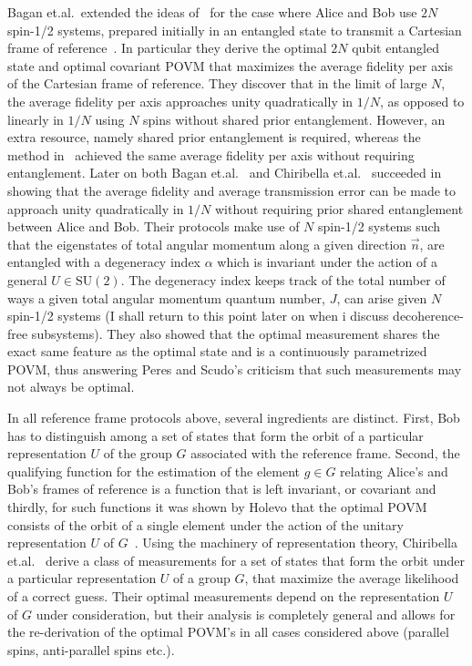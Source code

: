 \documentclass{article}
\begin{document}
Bagan et.al.~extended the ideas of~\cite{AJV01} for the case where Alice and Bob use $2N$ spin-1/2 systems, prepared initially in an entangled state to transmit a Cartesian frame of reference~\cite{BBM04a}.  In particular they derive the optimal $2N$ qubit entangled state and optimal covariant POVM that maximizes the average fidelity per axis of the Cartesian frame of reference. They discover that in the limit of large $N$, the average fidelity per axis approaches unity quadratically in $1/N$, as opposed to linearly in $1/N$ using $N$ spins without shared prior entanglement.  However, an extra resource, namely shared prior entanglement is required, whereas the method in~\cite{PS02a,PS02b} achieved the same average fidelity per axis without requiring entanglement.  Later on both Bagan et.al.~\cite{BBM04a} and Chiribella et.al.~\cite{CDPS04a} succeeded in showing that the average fidelity and average transmission error can be made to approach unity quadratically in $1/N$ without requiring prior shared entanglement between Alice and Bob.  Their protocols make use of $N$ spin-1/2 systems such that the eigenstates of total angular momentum along a given direction $\vec{n}$, are entangled with a degeneracy index $\alpha$ which is invariant under the action of a general $U\in\mathrm{SU}(2)$.  The degeneracy index keeps track of the total number of ways a given total angular momentum quantum number, $J$, can arise given $N$ spin-1/2 systems (I shall return to this point later on when i discuss decoherence-free subsystems).  They also showed that the optimal measurement shares the exact same feature as the optimal state and is a continuously parametrized POVM, thus answering Peres and Scudo's criticism that such measurements may not always be optimal.

In all reference frame protocols above, several ingredients are distinct.  First, Bob has to distinguish among a set of states that form the orbit of a particular representation $U$ of the group $G$ associated with the reference frame.  Second, the qualifying function for the estimation of the element $g\in G$ relating Alice's and Bob's frames of reference is a function that is left invariant, or covariant and thirdly, for such functions it was shown by Holevo that the optimal POVM consists of the orbit of a single element under the action of the unitary representation $U$ of $G$~\cite{H80}.  Using the machinery of representation theory, Chiribella et.al.~\cite{CDPS04b} derive a class of measurements for a set of states that form the orbit under a particular representation $U$ of a group $G$, that maximize the average likelihood of a correct guess. Their optimal measurements depend on the representation $U$ of $G$ under consideration, but their analysis is completely general and allows for the re-derivation of the optimal POVM's in all cases considered above (parallel spins, anti-parallel spins etc.).
\end{document}
